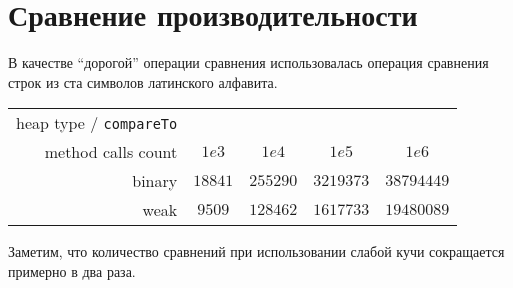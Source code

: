 \documentclass[12pt,a4paper]{article}
\begin{document}
\section*{Сравнение производительности}
В качестве ``дорогой'' операции сравнения использовалась операция сравнения строк из ста символов латинского алфавита.

\begin{tabular} {r || c | c | c | c}
	heap type / \texttt{compareTo} \\ method calls count & $1e3$ & $1e4$ & $1e5$ & $1e6$ \\
	\hline
	binary & $18841$ & $255290$ & $3219373$ & $38794449$ \\
	weak & $9509$ & $128462$ & $1617733$ & $19480089$ \\
\end{tabular}

Заметим, что количество сравнений при использовании слабой кучи сокращается примерно в два раза.
\end{document}

